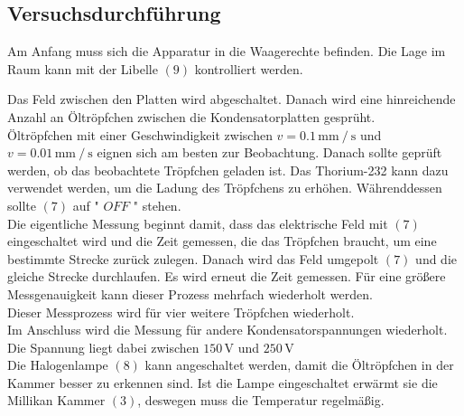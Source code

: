 \subsection{Versuchsdurchführung}
Am Anfang muss sich die Apparatur in die Waagerechte befinden. Die Lage im Raum kann mit der Libelle $(9)$ kontrolliert werden.

Das Feld zwischen den Platten wird abgeschaltet. Danach wird eine hinreichende Anzahl an Öltröpfchen zwischen die Kondensatorplatten gesprüht. \\

Öltröpfchen mit einer Geschwindigkeit zwischen $v = 0.1 \, \unit{\milli\meter} \mathbin{/} \unit{\second}$ und $v = 0.01 \, \unit{\milli\meter} \mathbin{/} \unit{\second}$ eignen sich am besten zur Beobachtung.
Danach sollte geprüft werden, ob das beobachtete Tröpfchen geladen ist. Das Thorium-232 kann dazu verwendet werden, um die Ladung des Tröpfchens zu erhöhen. Währenddessen sollte $(7)$ auf " $OFF$ "${}$ stehen. \\

Die eigentliche Messung beginnt damit, dass das elektrische Feld mit $(7)$ eingeschaltet wird und die Zeit gemessen, die das Tröpfchen braucht, um eine bestimmte Strecke zurück zulegen.
Danach wird das Feld umgepolt $ (7) $ und die gleiche Strecke durchlaufen. Es wird erneut die Zeit gemessen. Für eine größere Messgenauigkeit kann dieser Prozess mehrfach wiederholt werden.
\\

Dieser Messprozess wird für vier weitere Tröpfchen wiederholt.\\

Im Anschluss wird die Messung für andere Kondensatorspannungen wiederholt. Die Spannung liegt dabei zwischen $150 \, \unit{\volt}$ und $250 \, \unit{\volt}$\\

Die Halogenlampe $(8)$ kann angeschaltet werden, damit die Öltröpfchen in der Kammer besser zu erkennen sind.
Ist die Lampe eingeschaltet erwärmt sie die Millikan Kammer $(3)$, deswegen muss die Temperatur regelmäßig.
